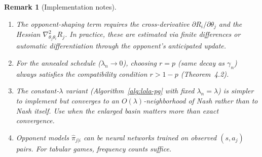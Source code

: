 \documentclass[11pt,a4paper]{article}
\newtheorem{remark}[theorem]{Remark}
\begin{document}
\begin{remark}[Implementation notes]
\begin{enumerate}
  \item The opponent-shaping term requires the cross-derivative
    $\partial R_i / \partial \theta_j$ and the Hessian
    $\nabla^2_{\theta_j \theta_i} R_j$. In practice, these are estimated
    via finite differences or automatic differentiation through the
    opponent's anticipated update.
  \item For the annealed schedule ($\lambda_n \to 0$), choosing
    $r = p$ (same decay as $\gamma_n$) always satisfies the compatibility
    condition $r > 1 - p$ (Theorem~4.2).
  \item The constant-$\lambda$ variant (Algorithm~\ref{alg:lola-pg} with
    fixed $\lambda_n = \lambda$) is simpler to implement but converges
    to an $O(\lambda)$-neighborhood of Nash rather than to Nash itself.
    Use when the enlarged basin matters more than exact convergence.
  \item Opponent models $\hat{\pi}_{j|i}$ can be neural networks trained
    on observed $(s, a_j)$ pairs. For tabular games, frequency counts suffice.
\end{enumerate}
\end{remark}
\end{document}
